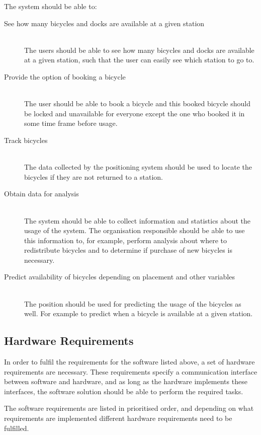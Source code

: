 The system should be able to:
\begin{description}
\item[See how many bicycles and docks are available at a given station] \hfill \\
The users should be able to see how many bicycles and docks are available at a given station, such that the user can easily see which station to go to.
\item[Provide the option of booking a bicycle] \hfill \\
The user should be able to book a bicycle and this booked bicycle should be locked and unavailable for everyone except the one who booked it in some time frame before usage.
\item[Track bicycles] \hfill \\
The data collected by the positioning system should be used to locate the bicycles if they are not returned to a station.
\item[Obtain data for analysis] \hfill \\
The system should be able to collect information and statistics about the usage of the system.
The organisation responsible should be able to use this information to, for example, perform analysis about where to redistribute bicycles and to determine if purchase of new bicycles is necessary.
\item[Predict availability of bicycles depending on placement and other variables] \hfill \\
The position should be used for predicting the usage of the bicycles as well. 
For example to predict when a bicycle is available at a given station.
\end{description}

\subsection{Hardware Requirements}
In order to fulfil the requirements for the software listed above, a set of hardware requirements are necessary.
These requirements specify a communication interface between software and hardware, and as long as the hardware implements these interfaces, the software solution should be able to perform the required tasks.

The software requirements are listed in prioritised order, and depending on what requirements are implemented different hardware requirements need to be fulfilled. 

